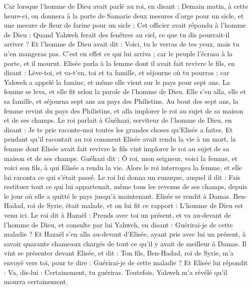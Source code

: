 \begin{multicols}{2}
Car lorsque l’homme de Dieu avait parlé au roi, en disant : Demain matin, à cette heure-ci, on donnera à la porte de Samarie deux mesures d’orge pour un sicle, et une mesure de fleur de farine pour un sicle ;
Cet officier avait répondu à l’homme de Dieu : Quand Yahweh ferait des fenêtres au ciel, ce que tu dis pourrait-il arriver ? Et l’homme de Dieu avait dit : Voici, tu le verras de tes yeux, mais tu n’en mangeras pas.
C’est en effet ce qui lui arriva ; car le peuple l’écrasa à la porte, et il mourut.
\VerseOne{}Elisée parla à la femme dont il avait fait revivre le fils, en disant : Lève-toi, et va-t’en, toi et ta famille, et séjourne où tu pourras ; car Yahweh a appelé la famine, et même elle vient sur le pays pour sept ans.
La femme se leva, et elle fit selon la parole de l’homme de Dieu. Elle s’en alla, elle et sa famille, et séjourna sept ans au pays des Philistins.
Au bout des sept ans, la femme revint du pays des Philistins, et alla implorer le roi au sujet de sa maison et de ses champs.
Le roi parlait à Guéhazi, serviteur de l’homme de Dieu, en disant : Je te prie raconte-moi toutes les grandes choses qu’Elisée a faites.
Et pendant qu’il racontait au roi comment Elisée avait rendu la vie à un mort, la femme dont Elisée avait fait revivre le fils vint implorer le roi au sujet de sa maison et de ses champs. Guéhazi dit : Ô roi, mon seigneur, voici la femme, et voici son fils, à qui Elisée a rendu la vie.
Alors le roi interrogea la femme, et elle lui raconta ce qui s’était passé. Le roi lui donna un eunuque, auquel il dit : Fais restituer tout ce qui lui appartenait, même tous les revenus de ses champs, depuis le jour où elle a quitté le pays jusqu’à maintenant.
Elisée se rendit à Damas. Ben-Hadad, roi de Syrie, était malade, et on lui fit ce rapport : L’homme de Dieu est venu ici.
Le roi dit à Hazaël : Prends avec toi un présent, et va au-devant de l’homme de Dieu, et consulte par lui Yahweh, en disant : Guérirai-je de cette maladie ?
Et Hazaël s’en alla au-devant d’Elisée, ayant pris avec lui un présent, à savoir quarante chameaux chargés de tout ce qu’il y avait de meilleur à Damas. Il vint se présenter devant Elisée, et dit : Ton fils, Ben-Hadad, roi de Syrie, m’a envoyé vers toi, pour te dire : Guérirai-je de cette maladie ?
Et Elisée lui répondit : Va, dis-lui : Certainement, tu guériras. Toutefois, Yahweh m’a révélé qu’il mourra certainement.

\end{multicols}
